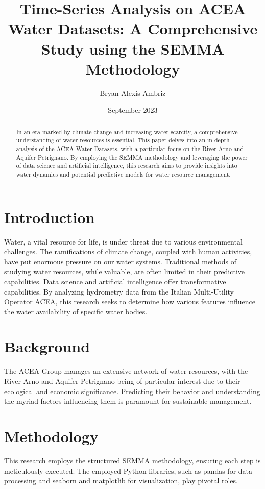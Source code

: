 \documentclass{article}
\title{Time-Series Analysis on ACEA Water Datasets: A Comprehensive Study using the SEMMA Methodology}
\author{Bryan Alexis Ambriz}
\date{September 2023}
\begin{document}
\maketitle

\begin{abstract}
In an era marked by climate change and increasing water scarcity, a comprehensive understanding of water resources is essential. This paper delves into an in-depth analysis of the ACEA Water Datasets, with a particular focus on the River Arno and Aquifer Petrignano. By employing the SEMMA methodology and leveraging the power of data science and artificial intelligence, this research aims to provide insights into water dynamics and potential predictive models for water resource management.
\end{abstract}

\section{Introduction}
Water, a vital resource for life, is under threat due to various environmental challenges. The ramifications of climate change, coupled with human activities, have put enormous pressure on our water systems. Traditional methods of studying water resources, while valuable, are often limited in their predictive capabilities. Data science and artificial intelligence offer transformative capabilities. By analyzing hydrometry data from the Italian Multi-Utility Operator ACEA, this research seeks to determine how various features influence the water availability of specific water bodies.

\section{Background}
The ACEA Group manages an extensive network of water resources, with the River Arno and Aquifer Petrignano being of particular interest due to their ecological and economic significance. Predicting their behavior and understanding the myriad factors influencing them is paramount for sustainable management.

\section{Methodology}
This research employs the structured SEMMA methodology, ensuring each step is meticulously executed. The employed Python libraries, such as pandas for data processing and seaborn and matplotlib for visualization, play pivotal roles.
\end{document}
